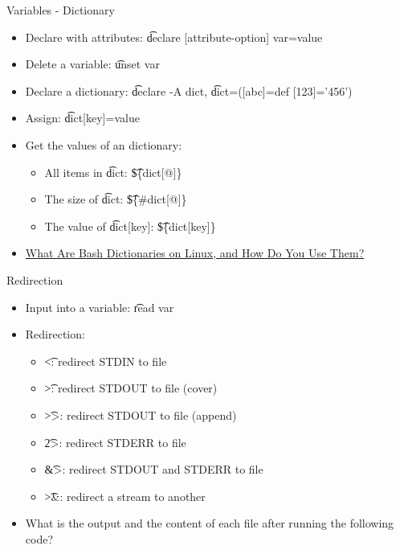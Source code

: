 \begin{frame}{Variables - Dictionary}
\begin{itemize}
\item Declare with attributes: \t{declare [attribute-option] var=value}
\item Delete a variable: \t{unset var}
\item Declare a dictionary: \t{declare -A dict}, \t{dict=([abc]=def [123]='456')}
\item Assign: \t{dict[key]=value}
\item Get the values of an dictionary:
\begin{itemize}
\item All items in \t{dict}: \t{\$\{dict[@]\}}
\item The size of \t{dict}: \t{\$\{\#dict[@]\}}
\item The value of \t{dict[key]}: \t{\$\{dict[key]\}}
\end{itemize}
\item \href{https://www.howtogeek.com/730243/what-are-bash-dictionaries-on-linux-and-how-do-you-use-them/}{What Are Bash Dictionaries on Linux, and How Do You Use Them?}
\end{itemize}
\end{frame}

\begin{frame}[fragile]{Redirection}
\begin{multicols}{2}
\begin{itemize}
\item Input into a variable: \t{read var}
\item Redirection:
\begin{itemize}
\item \t{<}: redirect STDIN to file
\item \t{>}: redirect STDOUT to file (cover)
\item \t{>>}: redirect STDOUT to file (append)
\item \t{2>}: redirect STDERR to file
\item \t{\&>}: redirect STDOUT and STDERR to file
\item \t{>\&}: redirect a stream to another
\end{itemize}
\newpage
\item What is the output and the content of each file after running the following code?

\end{itemize}
\end{multicols}
\end{frame}

